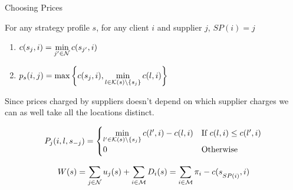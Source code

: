 \documentclass[aspectratio=1610,handout]{beamer}
\begin{document}
\begin{frame}{Choosing Prices}

\begin{theorem}
    For any strategy profile $s$, for any client $i$ and supplier $j$,  $SP(i)=j$ \begin{enumerate}[label=(\roman*)]
        \item $c(s_j,i)=\min\limits_{j'\in\mathcal{N}}c(s_{j'},i)$
        \item $p_s(i,j)=\max\left\{ c(s_j,i),\min\limits_{l\in \mathcal{K}(s)\setminus\{s_j\}}c(l,i)\right\}$
    \end{enumerate}
\end{theorem}\pause

Since prices charged by suppliers doesn't depend on which supplier charges we can as well take all the locations distinct.\pause

$$P_j(i,l,s_{-j})=\begin{cases}
    \min\limits_{l'\in \mathcal{K}(s)\setminus \{s_j\}}c(l',i)- c(l,i) & \text{If $c(l,i)\leq c(l',i)$}\\
    0 & \text{Otherwise}
\end{cases}$$\pause

$$W(s)=\sum\limits_{j\in\mathcal{N}}u_j(s)+\sum\limits_{i\in\mathcal{M}}D_i(s)=\sum\limits_{i\in\mathcal{M}}\pi_i-c(s\strut_{SP(i)},i)$$
\end{frame}
\end{document}
